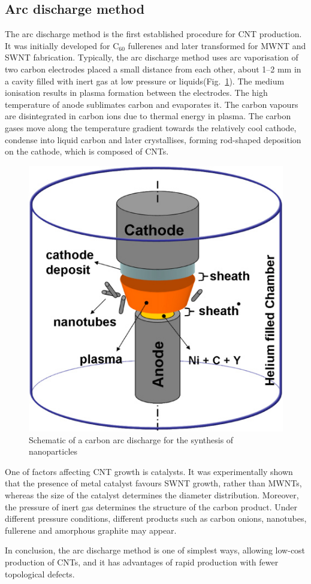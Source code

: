 \documentclass{phyasgn}\usepackage{nag}
\newcommand{\figref}[1]{Fig.~\ref{#1}}
\begin{document}
\subsection{Arc discharge method}
The arc discharge method is the first established procedure for CNT production. It was initially developed for C$_{60}$ fullerenes and later transformed for MWNT\cite{charlier2001growth} and SWNT\cite{bethune1993cobalt} fabrication. Typically, the arc discharge method uses arc vaporisation of two carbon electrodes placed a small distance from each other, about 1–2 mm in a cavity filled with inert gas at low pressure or liquids(\figref{5}). The medium ionisation results in plasma formation between the electrodes. The high temperature of anode sublimates carbon and evaporates it. The carbon vapours are disintegrated in carbon ions due to thermal energy in plasma. The carbon gases move along the temperature gradient towards the relatively cool cathode, condense into liquid carbon and later crystallises, forming rod-shaped deposition on the cathode, which is composed of CNTs\cite{arora2014arc}. 
\begin{figure}[!h]
	\centering
	\includegraphics[width=.5\linewidth]{pic/5.jpg}
	\caption[Band structures]{Schematic of a carbon arc discharge for the synthesis of nanoparticles\cite{kundrapu2012model}}
	\label{5}
	\end{figure}
\par One of factors affecting CNT growth is catalysts. It was experimentally shown that the presence of metal catalyst favours SWNT growth, rather than MWNTs, whereas the size of the catalyst determines the diameter distribution\cite{lin1994large}. Moreover, the pressure of inert gas determines the structure of the carbon product. Under different pressure conditions, different products such as carbon onions, nanotubes, fullerene and amorphous graphite may appear\cite{wilson2002nanotechnology}.
\par In conclusion, the arc discharge method is one of simplest ways, allowing low-cost production of CNTs, and it has advantages of rapid production with fewer topological defects\cite{kundrapu2012model}.
\end{document}
